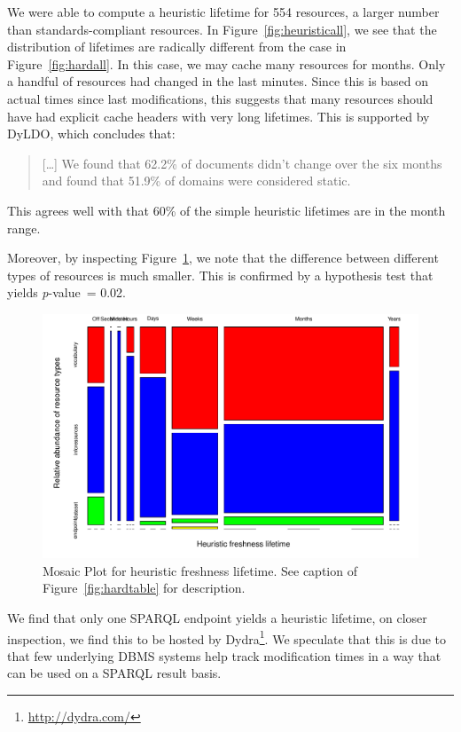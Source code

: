 \documentclass{llncs}
\newcommand{\pvalue}{\textit{p}-value\ }
\begin{document}
We were able to compute a heuristic lifetime for 554 resources, a
larger number than standards-compliant resources. In
Figure~\ref{fig:heuristicall}, we see that the distribution of
lifetimes are radically different from the case in
Figure~\ref{fig:hardall}. In this case, we may cache many resources
for months. Only a handful of resources had changed in the last
minutes. Since this is based on actual times since last modifications,
this suggests that many resources should have had explicit cache
headers with very long lifetimes. This is supported by
DyLDO\cite{dyldo2}, which concludes that:
\begin{quote}
[\ldots] We found that 62.2\% of documents didn’t change over the six
months and found that 51.9\% of domains were considered static.
\end{quote}
This agrees well with that 60\% of the simple heuristic lifetimes are
in the month range. 

Moreover, by inspecting Figure~\ref{fig:heuristictable}, we
note that the difference between different types of resources is much
smaller. This is confirmed by a hypothesis test that yields \pvalue =
0.02.

\begin{figure}[hb!]
  \centerline{%
    \includegraphics[width=.9\textwidth]{heuristictable.pdf}}
  \caption{Mosaic Plot for heuristic freshness lifetime. See caption
    of Figure~\ref{fig:hardtable} for description.  }
  \label{fig:heuristictable}
\end{figure}


We find that only one SPARQL endpoint yields a heuristic lifetime, on
closer inspection, we find this to be hosted by
Dydra\footnote{\url{http://dydra.com/}}. We speculate that this is due to
that few underlying DBMS systems help track modification times in a
way that can be used on a SPARQL result basis.
\end{document}

